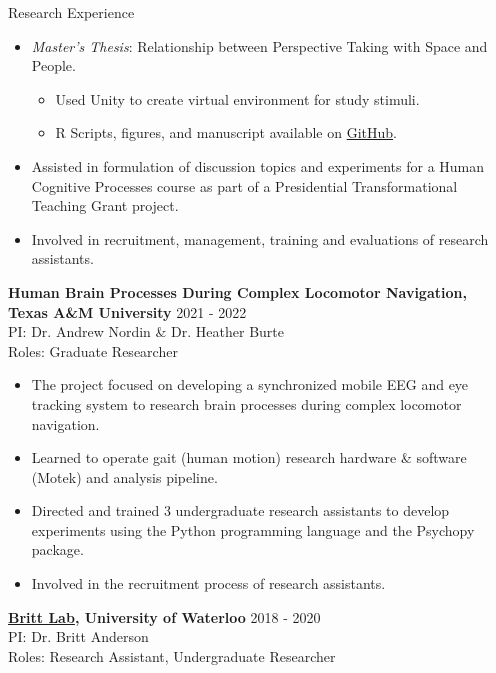 \documentclass{resume} %
\begin{document}
\begin{rSection}{Research Experience}
    \begin{itemize}[nosep]
        
        \item \emph{Master's Thesis}: Relationship between Perspective Taking 
        with Space and People.
            \begin{itemize}
                \item Used Unity to create virtual environment for study stimuli.
                \item R Scripts, figures, and manuscript available on \href{https://github.com/sjp117/spatialSocialPerspectiveTaking}{GitHub}.
            \end{itemize}
        \item Assisted in formulation of discussion topics and experiments for 
        a Human Cognitive Processes course as part of a Presidential 
        Transformational Teaching Grant project.
        \item Involved in recruitment, management, training and evaluations of research assistants.
        
    \end{itemize}

    {\bf {Human Brain Processes During Complex Locomotor Navigation},
        Texas A\&M University}
    \hfill {2021 - 2022}
    \\PI: Dr. Andrew Nordin \& Dr. Heather Burte
    \\Roles: Graduate Researcher
    
    \begin{itemize}[nosep]
        
        \item The project focused on developing a synchronized mobile EEG and eye tracking system to research brain processes during complex locomotor navigation.
        \item Learned to operate gait (human motion) research hardware \& software (Motek) and analysis pipeline.
        \item Directed and trained 3 undergraduate research assistants to 
        develop experiments using the Python programming language and the Psychopy package.
        \item Involved in the recruitment process of research assistants.
        
    \end{itemize}
    
    {\bf \href{https://brittlab.uwaterloo.ca/}{Britt Lab}, 
        University of Waterloo}
    \hfill {2018 - 2020}
    \\PI: Dr. Britt Anderson
    \\Roles: Research Assistant, Undergraduate Researcher
    

\end{rSection}
\end{document}
